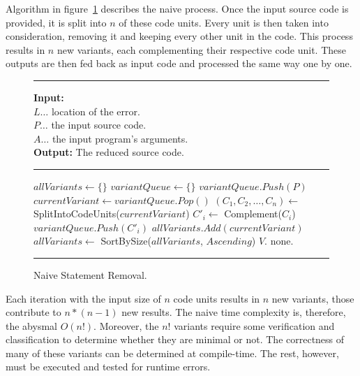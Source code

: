 Algorithm in figure~\ref{alg:naive} describes the naive process. 
Once the input source code is provided, it is split into $n$ of these 
code units.
Every unit is then taken into consideration, removing it and keeping every 
other unit in the code.
This process results in $n$ new variants, each complementing their 
respective code unit.
These outputs are then fed back as input code and processed the same way 
one by one.

\begin{figure}[h]
	\hrule height.8pt depth0pt \kern2pt
	\textbf{Input:} \\
	\hspace*{\algorithmicindent} $L \ldots$ location of the error. \\
	\hspace*{\algorithmicindent} $P \ldots$ the input source code. \\
	\hspace*{\algorithmicindent} $A \ldots$ the input program's arguments. \\
	\textbf{Output:} The reduced source code. 
	\hrule height.8pt depth0pt \kern2pt
	\begin{algorithmic}[1]
		\State $allVariants \leftarrow \{\}$
		\State $variantQueue \leftarrow \{\}$
		\State $variantQueue.Push(P)$
			\State $currentVariant \leftarrow variantQueue.Pop()$
			\State $(C_1, C_2, \ldots, C_n) \leftarrow$ SplitIntoCodeUnits($currentVariant$)
				\State ${C'}_i \leftarrow$ Complement($C_i$)
				\State $variantQueue.Push({C'}_i)$
			\EndFor
			\State $allVariants.Add(currentVariant)$
		\EndWhile
		\State $allVariants \leftarrow$ SortBySize($allVariants$, $Ascending$)
				\Return $V$.
			\EndIf
		\EndFor
		\State \Return none.
	\end{algorithmic} 
	\hrule height.8pt depth0pt \kern2pt
	\caption{Naive Statement Removal.} 
	\label{alg:naive}
\end{figure}

Each iteration with the input size of $n$ code units results in $n$ new 
variants, those contribute to $n * (n - 1) $ new results.
The naive time complexity is, therefore, the abysmal $O(n!)$.
Moreover, the $n!$ variants require some verification and classification 
to determine whether they are minimal or not.
The correctness of many of these variants can be determined at compile-time.
The rest, however, must be executed and tested for runtime errors.

